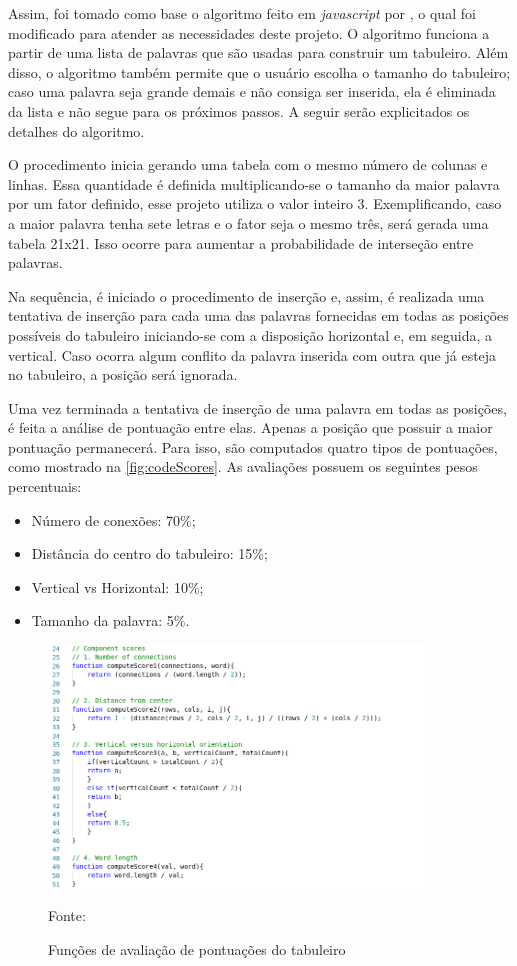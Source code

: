 Assim, foi tomado como base o algoritmo feito em \textit{javascript} por \cite{layoutGenerator}, o qual foi modificado para atender as necessidades deste projeto. O algoritmo funciona a partir de uma lista de palavras que são usadas para construir um tabuleiro. Além disso, o algoritmo também permite que o usuário escolha o tamanho do tabuleiro; caso uma palavra seja grande demais e não consiga ser inserida, ela é eliminada da lista e não segue para os próximos passos. A seguir serão explicitados os detalhes do algoritmo.

O procedimento inicia gerando uma tabela com o mesmo número de colunas e linhas. Essa quantidade é definida multiplicando-se o tamanho da maior palavra por um fator definido, esse projeto utiliza o valor inteiro 3. Exemplificando, caso a maior palavra tenha sete letras e o fator seja o mesmo três, será gerada uma tabela 21x21. Isso ocorre para aumentar a probabilidade de interseção entre palavras. 

Na sequência, é iniciado o procedimento de inserção e, assim, é realizada uma tentativa de inserção para cada uma das palavras fornecidas em todas as posições possíveis do tabuleiro iniciando-se com a disposição horizontal e, em seguida, a vertical. Caso ocorra algum conflito da palavra inserida com outra que já esteja no tabuleiro, a posição será ignorada. 

Uma vez terminada a tentativa de inserção de uma palavra em todas as posições, é feita a análise de pontuação entre elas. Apenas a posição que possuir a maior pontuação permanecerá. Para isso, são computados quatro tipos de pontuações, como mostrado na \autoref{fig:codeScores}. As avaliações possuem os seguintes pesos percentuais:

\begin{itemize}
    \item Número de conexões: 70\%;
    \item Distância do centro do tabuleiro: 15\%;
    \item Vertical vs Horizontal: 10\%;
    \item Tamanho da palavra: 5\%.
\end{itemize}

\begin{figure}[H]
\centering
    \caption{Funções de avaliação de pontuações do tabuleiro}
    \label{fig:codeScores}
    \includegraphics[width=0.9\textwidth]{Figuras/codeComponentScores.png}
    
    Fonte: \cite{layoutGenerator}
\end{figure}

